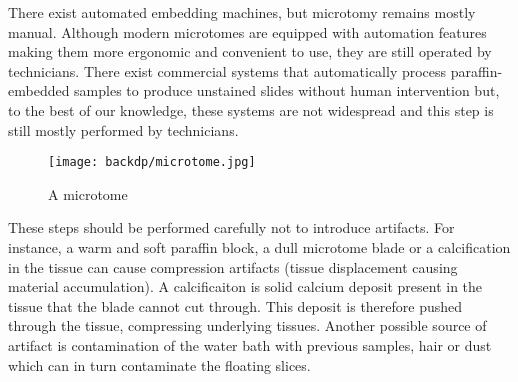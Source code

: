There exist automated embedding machines, but microtomy remains mostly manual. Although modern microtomes are equipped with automation features making them more ergonomic and convenient to use, they are still operated by technicians. There exist commercial systems that automatically process paraffin-embedded samples to produce unstained slides without human intervention but, to the best of our knowledge, these systems are not widespread and this step is still mostly performed by technicians. 

\begin{figure}
  \centering
  \texttt{[image: backdp/microtome.jpg]}
  \caption{A microtome}
  \label{fig:backdp:microtome}
\end{figure}

These steps should be performed carefully not to introduce artifacts. For instance, a warm and soft paraffin block, a dull microtome blade or a calcification in the tissue can cause compression artifacts (\ie tissue displacement causing material accumulation). A calcificaiton is solid calcium deposit present in the tissue that the blade cannot cut through. This deposit is therefore pushed through the tissue, compressing underlying tissues. Another possible source of artifact is contamination of the water bath with previous samples, hair or dust which can in turn contaminate the floating slices.   

